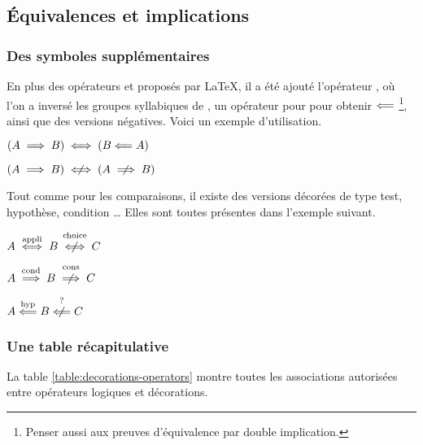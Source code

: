 \documentclass[12pt,a4paper]{article}
\begin{document}

\subsection{Équivalences et implications}

\subsubsection{Des symboles supplémentaires}


En plus des opérateurs  et  proposés par \LaTeX{}, il a été ajouté l'opérateur , où l'on a inversé les groupes syllabiques de , un opérateur pour pour obtenir $\mathrel{\Longleftarrow}$
\footnote{
	Penser aussi aux preuves d'équivalence par double implication.
},
ainsi que des versions négatives. Voici un exemple d'utilisation.

\begin{latexex}
$(A \implies B)
 \iff (B \mathrel{\Longleftarrow} A)$

$(A \implies B)
 \niff (A \nimplies B)$
\end{latexex}





Tout comme pour les comparaisons, il existe des versions décorées de type test, hypothèse, condition \dots{} 
Elles sont toutes présentes dans l'exemple suivant.

\begin{latexex}
$A \iffappli B \niffchoice C$

$A \impliescond B \nimpliescons C$

$A \liesimphyp B \nliesimptest C$
\end{latexex}


\subsubsection{Une table récapitulative}

La table \ref{table:decorations-operators}  montre toutes les associations autorisées entre opérateurs logiques et décorations.
\end{document}
